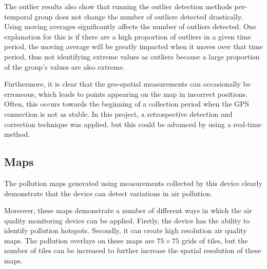 \documentclass[11pt]{report}
\begin{document}
The outlier results also show that running the outlier detection methods per-temporal group does not change the number of outliers detected drastically. Using moving averages significantly affects the number of outliers detected. One explanation for this is if there are a high proportion of outliers in a given time period, the moving average will be greatly impacted when it moves over that time period, thus not identifying extreme values as outliers because a large proportion of the group's values are also extreme.

Furthermore, it is clear that the geo-spatial measurements can occasionally be erroneous, which leads to points appearing on the map in incorrect positions. Often, this occurs towards the beginning of a collection period when the GPS connection is not as stable. In this project, a retrospective detection and correction technique was applied, but this could be advanced by using a real-time method. 

\subsection{Maps}

The pollution maps generated using measurements collected by this device clearly demonstrate that the device can detect variations in air pollution. 

Moreover, these maps demonstrate a number of different ways in which the air quality monitoring device can be applied. Firstly, the device has the ability to identify pollution hotspots. Secondly, it can create high resolution air quality maps. The pollution overlays on these maps are $75 \times 75$ grids of tiles, but the number of tiles can be increased to further increase the spatial resolution of these maps.
\end{document}
